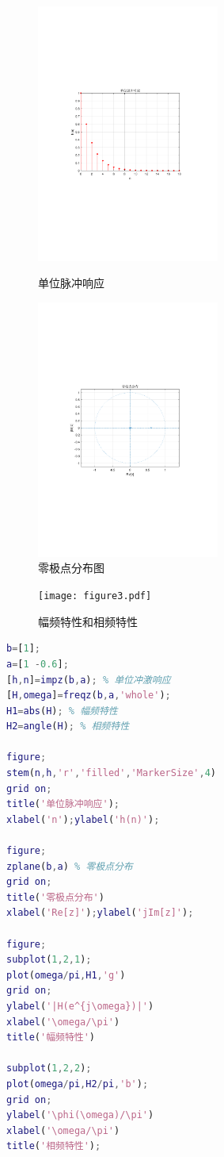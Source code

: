 \documentclass[12pt,AutoFakeBold]{article}
\begin{document}
\begin{figure}[htbp]
	\centering
	\begin{minipage}[t]{0.48\textwidth}
		\centering
		\includegraphics[width=6cm]{figure/impz1.pdf}
		\caption{单位脉冲响应}\label{fig:impz1}
	\end{minipage}
	\begin{minipage}[t]{0.48\textwidth}
		\centering
		\includegraphics[width=6cm]{figure/zplane1.pdf}
		\caption{零极点分布图}\label{fig:zplane1}
	\end{minipage}
\end{figure}

\begin{figure}[hbtp]
	\centering
	\texttt{[image: figure3.pdf]}
	\caption{幅频特性和相频特性}\label{fig:figure3}
\end{figure}

\begin{lstlisting}[language=Matlab]
b=[1];
a=[1 -0.6];
[h,n]=impz(b,a); % 单位冲激响应
[H,omega]=freqz(b,a,'whole');
H1=abs(H); % 幅频特性
H2=angle(H); % 相频特性

figure;
stem(n,h,'r','filled','MarkerSize',4)
grid on;
title('单位脉冲响应');
xlabel('n');ylabel('h(n)');

figure;
zplane(b,a) % 零极点分布
grid on;
title('零极点分布')
xlabel('Re[z]');ylabel('jIm[z]');

figure;
subplot(1,2,1);
plot(omega/pi,H1,'g')
grid on;
ylabel('|H(e^{j\omega})|')
xlabel('\omega/\pi')
title('幅频特性')

subplot(1,2,2);
plot(omega/pi,H2/pi,'b');
grid on;
ylabel('\phi(\omega)/\pi')
xlabel('\omega/\pi')
title('相频特性');
\end{lstlisting}
\end{document}
